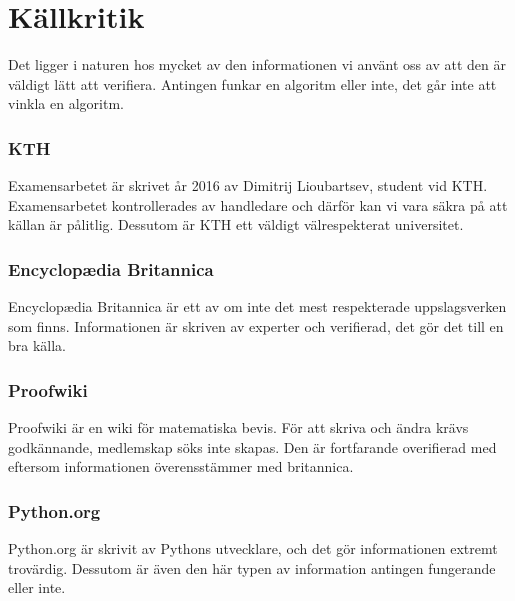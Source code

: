 \documentclass[12pt,a4paper]{article}
\begin{document}
\section{Källkritik}
Det ligger i naturen hos mycket av den informationen vi använt oss av att den är väldigt lätt att verifiera. Antingen funkar en algoritm eller inte, det går inte att vinkla en algoritm. 
\subsubsection{KTH}
Examensarbetet är skrivet år 2016 av Dimitrij Lioubartsev, student vid KTH. Examensarbetet kontrollerades av handledare och därför kan vi vara säkra på att källan är pålitlig. Dessutom är KTH ett väldigt välrespekterat universitet.
\subsubsection{Encyclopædia Britannica}
Encyclopædia Britannica är ett av om inte det mest respekterade uppslagsverken som finns. Informationen är skriven av experter och verifierad, det gör det till en bra källa. 
\subsubsection{Proofwiki}
Proofwiki är en wiki för matematiska bevis. För att skriva och ändra krävs godkännande, medlemskap söks inte skapas. Den är fortfarande overifierad med eftersom informationen överensstämmer med britannica.
\subsubsection{Python.org}
Python.org är skrivit av Pythons utvecklare, och det gör informationen extremt trovärdig. Dessutom är även den här typen av information antingen fungerande eller inte. 
\end{document}
